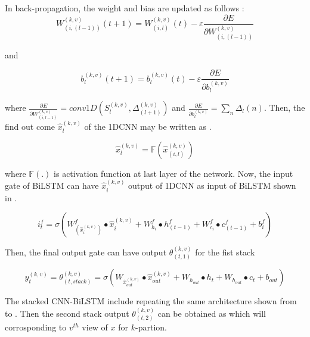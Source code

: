 \documentclass[a4paper, fleqn]{cas-sc}
\theoremstyle{definition}
\theoremstyle{remark}
\begin{document}
\begin{enumerate}[label=(\alph*)]
In back-propagation,  the weight and bias are updated as follows : 
\begin{equation} \label{backp}
  W_{(i, (l-1))}^{(k, v)} (t+1) =W_{(i, l)}^{(k, v)}(t)- \varepsilon \frac{\partial E}{\partial W_{(i, (l-1))}^{(k, v)}}
\end{equation}

and 

\begin{equation} \label{bias}
  b_l^{(k, v)} (t+1) = b_l^{(k, v)}(t)- \varepsilon \frac{\partial E}{\partial b_l^{(k, v)}}
\end{equation}

where $\frac{\partial E}{\partial W_{(i, l-1)}^{(k, v)}} =conv1D \left(S_l^{(k, v)},  \Delta_{(l+1)}^{(k, v)} \right)$ and $\frac{\partial E}{\partial b_l^{(k, v)} }=\sum_{n}^{}\Delta_{l} (n)$. 
Then,  the find out come $\hat{x}_l^{(k, v)}$ of the 1DCNN may be written as .

\begin{equation} \label{1dd hat}
  \hat{x}_l^{(k, v)}=\mathbb{F} \left(\hat{x}_{(i, l)}^{(k, v)} \right)
\end{equation}

where $\mathbb{F}(.)$ is activation function at last layer of the network. Now,  the input gate of BiLSTM can have $\hat{x}_i^{(k, v)}$ output of 1DCNN as input of BiLSTM shown in .

\begin{equation}
\label{si}
  i_t^f = \sigma \left(W_{\left(\hat{x}_i^{(k, v)} \right)}^f  \bullet \hat{x}_i^{(k, v)} +W_{h_i}^f \bullet h_{(t-1)}^f +W_{c_i}^f \bullet c_{(t-1)}^f +b_i^f \right)
\end{equation}

Then, the final output gate can have output $\theta _{(t, 1)}^{(k, v)}$ for the fist stack

\begin{equation} \label{thi fin}
  \hat{y}_t^{(k, v)}=\theta _{(t, stack)}^{(k, v)}= \sigma \left(W_{\hat{x}_{out}^{(k, v)}} \bullet \hat{x}_{out}^{(k, v)} +  W_{h_{out}} \bullet h_t +W_{h_{out}} \bullet c_t +b_{out} \right)
\end{equation}

The stacked CNN-BiLSTM include repeating the same architecture shown from  to . Then the second stack output $\theta _{(t, 2)}^{(k, v)}$ can be obtained as  which will corrosponding  to $v^{th}$ view of $x$ for $k$-partion. 




\end{enumerate}
\end{document}
